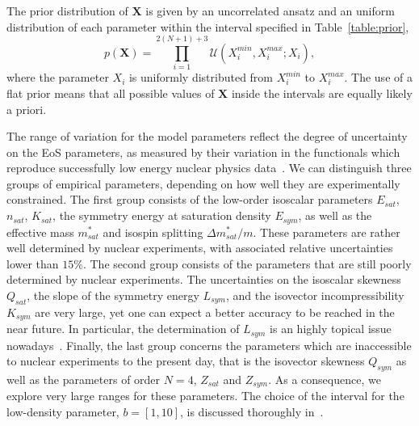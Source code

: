 The prior distribution of $\bm{X}$ is given by an uncorrelated ansatz and an
uniform distribution of each parameter within the interval specified in
Table~\ref{table:prior},
%
\begin{equation}
  p(\bm{X}) = \prod_{i=1}^{2(N+1)+3} \mathcal{U}(X_i^{min}, X_i^{max};X_i),
\end{equation}
%
where the parameter $X_i$ is uniformly distributed from $X_i^{min}$ to 
$X_i^{max}$. The use of a flat prior means that all possible values of 
$\bm{X}$ inside the intervals are equally likely a priori.

The range of variation for the model parameters reflect the degree of 
uncertainty on the EoS parameters, as measured by their variation in the 
functionals which reproduce successfully low energy nuclear physics
data~\cite{Margueron2018a}. We can distinguish three groups of empirical  
parameters, depending on how well they are experimentally constrained. The 
first group consists of the low-order isoscalar parameters $E_{sat}$, 
$n_{sat}$, $K_{sat}$, the symmetry energy at saturation density $E_{sym}$, as 
well as the effective mass $m_{sat}^*$ and isospin splitting 
$\Delta m_{sat}^*/m$. These parameters are rather well determined by nuclear 
experiments, with associated relative uncertainties lower than $15\%$. The 
second group consists of the parameters that are still poorly determined by 
nuclear experiments. The uncertainties on the isoscalar skewness $Q_{sat}$, the 
slope of the symmetry energy $L_{sym}$, and the isovector incompressibility 
$K_{sym}$ are very large, yet one can expect a better accuracy to be 
reached in the near future. In particular, the determination of $L_{sym}$ is 
an highly topical issue nowadays~\cite{Li2014}. Finally, the last group 
concerns the parameters which are inaccessible to nuclear experiments to the 
present day, that is the isovector skewness $Q_{sym}$ as well as the parameters 
of order $N=4$, $Z_{sat}$ and $Z_{sym}$. As a consequence, we explore very 
large ranges for these parameters. 
The choice of the interval for the low-density parameter, $b = [1,10]$, is 
discussed thoroughly in~\cite{Antic2019}. 

